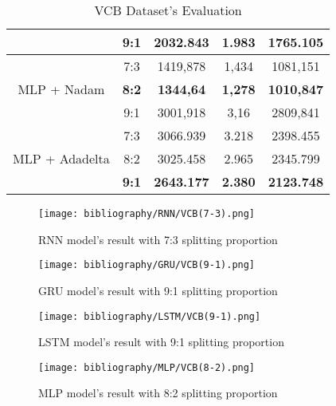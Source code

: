 \documentclass{ieeeojies}
\begin{document}
\begin{table}[H]
\begin{tabular}{|c|c|c|c|c|}
         & 9:1 & 2032.843 & 1.983 & 1765.105\\
         \hline
         \multirow{3}{*}{MLP + Nadam} 
         & 7:3 & 1419,878 & 1,434 & 1081,151 \\ 
         & \textbf{8:2} & \textbf{1344,64} & \textbf{1,278} & \textbf{1010,847} \\ 
         & 9:1 & 3001,918 &	3,16 & 2809,841 \\
         \hline
         \multirow{3}{*}{MLP + Adadelta} 
         & 7:3 & 3066.939 & 3.218 & 2398.455 \\ 
         & 8:2 & 3025.458 & 2.965 & 2345.799 \\ 
         & \textbf{9:1} & \textbf{2643.177} & \textbf{2.380} & \textbf{2123.748}\\
         \hline
    \end{tabular}
    \caption{VCB Dataset's Evaluation}
    \label{vcbresult}
\end{table}

\begin{figure}[H]
  \centering
  \begin{minipage}{0.7\linewidth}
    \centering
    \texttt{[image: bibliography/RNN/VCB(7-3).png]}
    \caption{RNN model's result with 7:3 splitting proportion}
    \label{fig8}
  \end{minipage}
\end{figure}

\begin{figure}[H]
  \centering
  \begin{minipage}{0.7\linewidth}
    \centering
    \texttt{[image: bibliography/GRU/VCB(9-1).png]}
    \caption{GRU model's result with 9:1 splitting proportion}
    \label{fig8}
  \end{minipage}
\end{figure}

\begin{figure}[H]
  \centering
  \begin{minipage}{0.7\linewidth}
    \centering
    \texttt{[image: bibliography/LSTM/VCB(9-1).png]}
    \caption{LSTM model's result with 9:1 splitting proportion}
    \label{fig8}
  \end{minipage}
\end{figure}

\begin{figure}[H]
  \centering
  \begin{minipage}{0.7\linewidth}
    \centering
    \texttt{[image: bibliography/MLP/VCB(8-2).png]}
    \caption{MLP model's result with 8:2 splitting proportion}
    \label{fig8}
  \end{minipage}
\end{figure}
\end{document}

